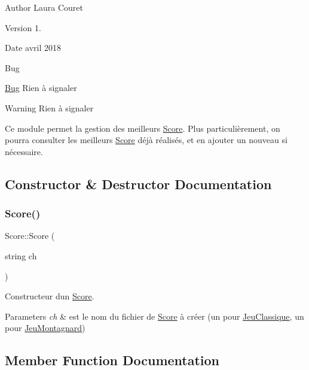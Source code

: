 \begin{DoxyAuthor}{Author}
Laura Couret 
\end{DoxyAuthor}
\begin{DoxyVersion}{Version}
1. 
\end{DoxyVersion}
\begin{DoxyDate}{Date}
avril 2018 
\end{DoxyDate}
\begin{DoxyRefDesc}{Bug}
\item[\hyperlink{bug__bug000018}{Bug}]Rien à signaler \end{DoxyRefDesc}
\begin{DoxyWarning}{Warning}
Rien à signaler
\end{DoxyWarning}
Ce module permet la gestion des meilleurs \hyperlink{classScore}{Score}. Plus particulièrement, on pourra consulter les meilleurs \hyperlink{classScore}{Score} déjà réalisés, et en ajouter un nouveau si nécessaire. 

\subsection{Constructor \& Destructor Documentation}
\mbox{\label{classScore_a93772a8d3e8c9f71cd3e4a0bf74d9e78}} 
\subsubsection{\texorpdfstring{Score()}{Score()}}
{\footnotesize\ttfamily Score\+::\+Score (\begin{DoxyParamCaption}\item[{string}]{ch }\end{DoxyParamCaption})}



Constructeur d\textquotesingle{}un \hyperlink{classScore}{Score}. 


\begin{DoxyParams}{Parameters}
{\em ch} & est le nom du fichier de \hyperlink{classScore}{Score} à créer (un pour \hyperlink{classJeuClassique}{Jeu\+Classique}, un pour \hyperlink{classJeuMontagnard}{Jeu\+Montagnard}) \\
\hline
\end{DoxyParams}


\subsection{Member Function Documentation}
\mbox{\label{classScore_a6575097aed9e43ec2b8c5926e00134c1}} 
